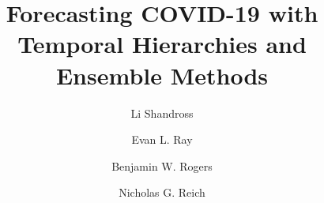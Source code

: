 \documentclass[12pt]{article}
\begin{document}


\title{Forecasting COVID-19 with\protect\\Temporal Hierarchies and Ensemble Methods}
\author{Li Shandross}
\author{Evan L. Ray}
\author{Benjamin W. Rogers}
\author{Nicholas G. Reich}

\maketitle
\end{document}
